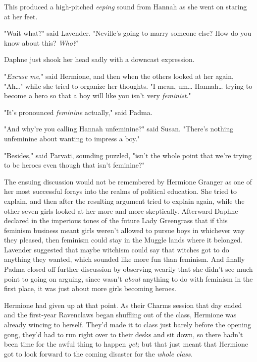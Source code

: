 This produced a high-pitched \emph{eeping} sound from Hannah as she went on 
staring at her feet.

"Wait what?" said Lavender. "Neville's going to marry someone else? How do you 
know about this? \emph{Who?}"

Daphne just shook her head sadly with a downcast expression.

"\emph{Excuse me}," said Hermione, and then when the others looked at her 
again, "Ah{\ldots}" while she tried to organize her thoughts. "I mean, 
um{\ldots} Hannah{\ldots} trying to become a hero so that a boy will like you 
isn't very \emph{feminist}."

"It's pronounced \emph{feminine} actually," said Padma.

"And why're you calling Hannah unfeminine?" said Susan. "There's nothing 
unfeminine about wanting to impress a boy."

"Besides," said Parvati, sounding puzzled, "isn't the whole point that we're 
trying to be heroes even though that isn't feminine?"

The ensuing discussion would not be remembered by Hermione Granger as one of 
her most successful forays into the realms of political education. She tried to 
explain, and then after the resulting argument tried to explain again, while 
the other seven girls looked at her more and more skeptically. Afterward Daphne 
declared in the imperious tones of the future Lady Greengrass that if this 
feminism business meant girls weren't allowed to pursue boys in whichever way 
they pleased, then feminism could stay in the Muggle lands where it belonged. 
Lavender suggested that maybe witchism could say that witches got to do 
anything they wanted, which sounded like more fun than feminism. And finally 
Padma closed off further discussion by observing wearily that she didn't see 
much point to going on arguing, since \SPHEW wasn't\emph{ about} anything 
to do with feminism in the first place, it was just about more girls becoming 
heroes.

Hermione had given up at that point.
\sbreak
As their Charms session that day ended and the first-year Ravenclaws began 
shuffling out of the class, Hermione was already wincing to herself. They'd 
made it to class just barely before the opening gong, they'd had to run right 
over to their desks and sit down, so there hadn't been time for the awful thing 
to happen \emph{yet;} but that just meant that Hermione got to look forward to 
the coming disaster for the \emph{whole class.}

